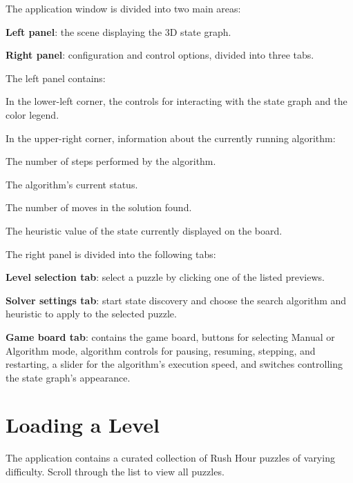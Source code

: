 The application window is divided into two main areas:
\begin{compactitem}
    \item \textbf{Left panel}: the scene displaying the 3D state graph.
    \item \textbf{Right panel}: configuration and control options, divided into three tabs.
\end{compactitem}

The left panel contains:
\begin{compactitem}
    \item In the lower-left corner, the controls for interacting with the state graph and the color legend.
    \item In the upper-right corner, information about the currently running algorithm:
    \begin{compactitem}
        \item The number of steps performed by the algorithm.
        \item The algorithm's current status.
        \item The number of moves in the solution found.
        \item The heuristic value of the state currently displayed on the board.
    \end{compactitem}
\end{compactitem}

The right panel is divided into the following tabs:
\begin{compactitem}
    \item \textbf{Level selection tab}: select a puzzle by clicking one of the listed previews.
    \item \textbf{Solver settings tab}: start state discovery and choose the search algorithm and heuristic to apply to the selected puzzle.
    \item \textbf{Game board tab}: contains the game board, buttons for selecting Manual or Algorithm mode, algorithm controls for pausing, resuming, stepping, and restarting, a slider for the algorithm's execution speed, and switches controlling the state graph's appearance.
\end{compactitem}

\section{Loading a Level}

The application contains a curated collection of Rush Hour puzzles of varying difficulty. Scroll through the list to view all puzzles.

